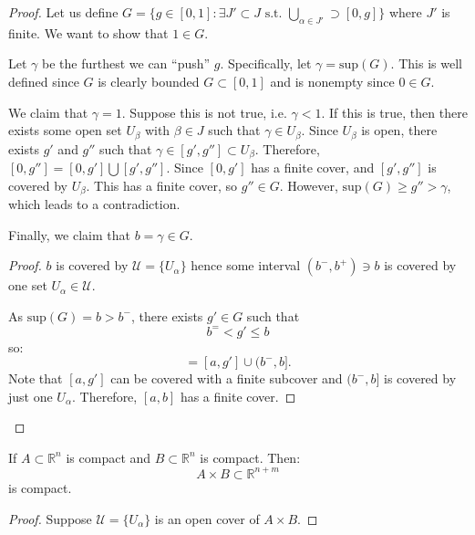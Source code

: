 \begin{itemize}
\begin{proof}
              Let us define $G=\{g\in [0,1]:\exists J' \subset J \text{ s.t. } \bigcup_{\alpha\in J'} \supset [0,g]\}$ where $J'$ is finite. We want to show that $1\in G.$
              \vspace{2mm}

              Let $\gamma$ be the furthest we can ``push'' $g$. Specifically, let $\gamma = \text{sup} (G)$. This is well defined since $G$ is clearly bounded $G \subset [0,1]$ and is nonempty since $0\in G.$
              \vspace{2mm}

              We claim that $\gamma = 1$. Suppose this is not true, i.e. $\gamma < 1$. If this is true, then there exists some open set $U_\beta$ with $\beta \in J$ such that $\gamma \in U_\beta.$ Since $U_\beta$ is open, there exists $g'$ and $g''$ such that $\gamma \in [g',g''] \subset U_\beta.$ Therefore, $[0,g''] = [0,g']\bigcup [g',g''].$ Since $[0,g']$ has a finite cover, and $[g',g'']$ is covered by $U_\beta$. This has a finite cover, so $g'' \in G$. However, $\text{sup}(G) \ge g'' > \gamma$, which leads to a contradiction.
              \vspace{2mm}

              Finally, we claim that $b=\gamma \in G$.
              \begin{proof}
                  $b$ is covered by $\mathcal{U}=\{U_\alpha\}$ hence some interval $(b^-,b^+)\ni b$ is covered by one set $U_\alpha \in \mathcal{U}.$

                  As $\text{sup}(G)=b>b^-$, there exists $g'\in G$ such that
                  \begin{equation}
                      b^= < g' \le b
                  \end{equation}
                  so:
                  \begin{equation}
                      [a,b]=[a,g']\cup (b^-,b].
                  \end{equation}
                  Note that $[a,g']$ can be covered with a finite subcover and $(b^-, b]$ is covered by just one $U_\alpha$. Therefore, $[a,b]$ has a finite cover.
              \end{proof}
          \end{proof}
          \begin{theorem}
              If $A\subset \mathbb{R}^n$ is compact and $B\subset \mathbb{R}^n$ is compact. Then:
              \begin{equation}
                  A \times B \subset \mathbb{R}^{n+m}
              \end{equation}
              is compact.
          \end{theorem}
          \begin{proof}
              Suppose $\mathcal{U}=\{U_\alpha\}$ is an open cover of $A\times B$.


\end{proof}
\end{itemize}

